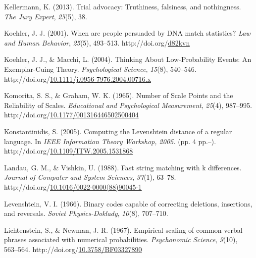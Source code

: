 \documentclass[print]{nuthesis}
\newlength{\cslhangindent}
\newenvironment{CSLReferences}[2]%
{\setlength{\parindent}{0pt}%
\everypar{\setlength{\hangindent}{\cslhangindent}}\ignorespaces}%
{\par}
\begin{document}
\begin{CSLReferences}{1}{0}
\leavevmode{}%
Kellermann, K. (2013). Trial advocacy: {Truthiness}, falsiness, and nothingness. \emph{The Jury Expert}, \emph{25}(5), 38.

\leavevmode{}%
Koehler, J. J. (2001). When are people persuaded by {DNA} match statistics? \emph{Law and Human Behavior}, \emph{25}(5), 493--513. http://doi.org/\href{https://doi.org/d82kvn}{d82kvn}

\leavevmode{}%
Koehler, J. J., \& Macchi, L. (2004). Thinking {About} {Low}-{Probability} {Events}: {An} {Exemplar}-{Cuing} {Theory}. \emph{Psychological Science}, \emph{15}(8), 540--546. http://doi.org/\href{https://doi.org/10.1111/j.0956-7976.2004.00716.x}{10.1111/j.0956-7976.2004.00716.x}

\leavevmode{}%
Komorita, S. S., \& Graham, W. K. (1965). Number of {Scale} {Points} and the {Reliability} of {Scales}. \emph{Educational and Psychological Measurement}, \emph{25}(4), 987--995. http://doi.org/\href{https://doi.org/10.1177/001316446502500404}{10.1177/001316446502500404}

\leavevmode{}%
Konstantinidis, S. (2005). Computing the {Levenshtein} distance of a regular language. In \emph{{IEEE} {Information} {Theory} {Workshop}, 2005.} (pp. 4 pp.--). http://doi.org/\href{https://doi.org/10.1109/ITW.2005.1531868}{10.1109/ITW.2005.1531868}

\leavevmode{}%
Landau, G. M., \& Vishkin, U. (1988). Fast string matching with k differences. \emph{Journal of Computer and System Sciences}, \emph{37}(1), 63--78. http://doi.org/\href{https://doi.org/10.1016/0022-0000(88)90045-1}{10.1016/0022-0000(88)90045-1}

\leavevmode{}%
Levenshtein, V. I. (1966). Binary codes capable of correcting deletions, insertions, and reversals. \emph{Soviet Physics-Doklady}, \emph{10}(8), 707--710.

\leavevmode{}%
Lichtenstein, S., \& Newman, J. R. (1967). Empirical scaling of common verbal phrases associated with numerical probabilities. \emph{Psychonomic Science}, \emph{9}(10), 563--564. http://doi.org/\href{https://doi.org/10.3758/BF03327890}{10.3758/BF03327890}


\end{CSLReferences}
\end{document}
